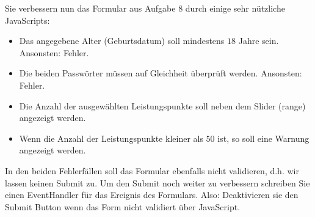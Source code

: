 %
\par Sie verbessern nun das Formular aus Aufgabe 8 durch einige sehr nützliche
JavaScripts:
%
\begin{itemize}
\item
Das angegebene Alter (Geburtsdatum) soll mindestens $18$ Jahre sein. Ansonsten:
Fehler.
\item
Die beiden Passwörter müssen auf Gleichheit überprüft werden. Ansonsten:
Fehler.
\item
Die Anzahl der ausgewählten Leistungspunkte soll neben dem Slider (range)
angezeigt werden.
\item
Wenn die Anzahl der Leistungspunkte kleiner als $50$ ist, so soll eine Warnung
angezeigt werden.
\end{itemize}
%
\par In den beiden Fehlerfällen soll das Formular ebenfalls nicht validieren,
d.h. wir lassen keinen Submit zu. Um den Submit noch weiter zu verbessern
schreiben Sie einen EventHandler für das  Ereignis des Formulars.
Also: Deaktivieren sie den Submit Button wenn das Form nicht validiert über
JavaScript.